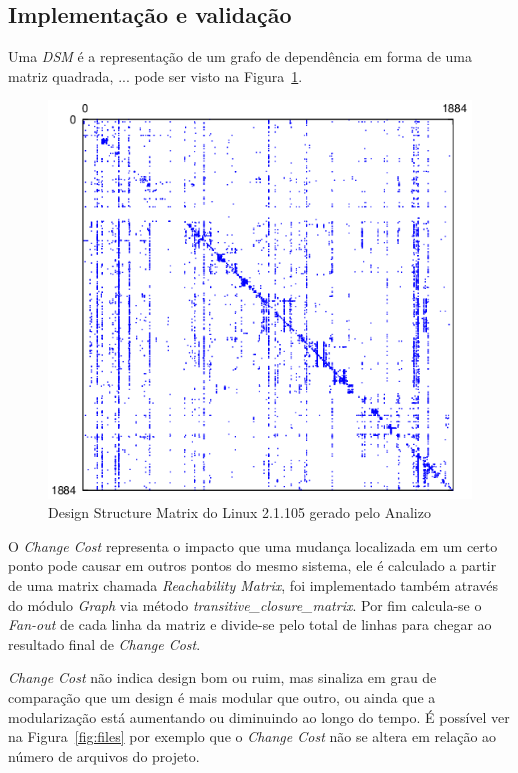 \subsection{Implementação e validação}

Uma {\it DSM} é a representação de um grafo de dependência em forma de uma
matriz quadrada, 
...
pode ser visto na Figura~\ref{fig:dsm}.

\begin{figure}[h]
\center
\includegraphics[scale=0.3]{imagens/sample-dsm.png}
\caption{Design Structure Matrix do Linux 2.1.105 gerado pelo Analizo}
\label{fig:dsm}
\end{figure}

O {\it Change Cost} representa o impacto que uma mudança localizada em um
certo ponto pode causar em outros pontos do mesmo sistema, ele é calculado a
partir de uma matrix chamada {\it Reachability
Matrix}\cite{ReachabilityMatrices}, foi implementado também através do módulo
{\it Graph} via método {\it transitive\_closure\_matrix}. Por fim calcula-se o
{\it Fan-out} de cada linha da matriz e divide-se pelo total de linhas para
chegar ao resultado final de {\it Change Cost}.

{\it Change Cost} não indica design bom ou ruim, mas sinaliza em grau de
comparação que um design é mais modular que outro, ou ainda que a
modularização está aumentando ou diminuindo ao longo do tempo. É possível ver na
Figura~\ref{fig:files} por exemplo que o {\it Change Cost} não se altera em
relação ao número de arquivos do projeto.

